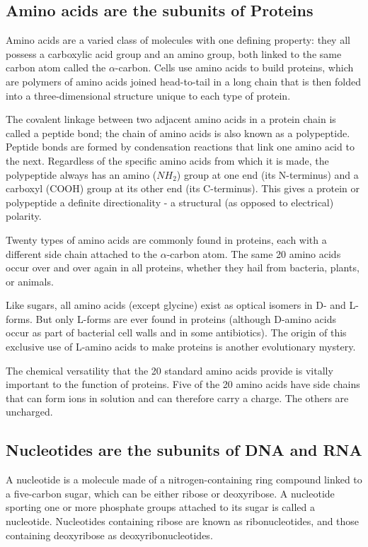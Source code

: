 \subsection{Amino acids are the subunits of Proteins}

Amino acids are a varied class of molecules with one defining property:
they all possess a carboxylic acid group and an amino group, both
linked to the same carbon atom called the $\alpha$-carbon.
Cells use amino acids to build proteins, which are polymers of
amino acids joined head-to-tail in a long chain that is then folded into a
three-dimensional structure unique to each type of protein.

The covalent linkage between two adjacent amino acids in a protein
chain is called a peptide bond; the chain of amino acids is also known as
a polypeptide. Peptide bonds are formed by condensation
reactions that link one amino acid to the next. Regardless of the specific
amino acids from which it is made, the polypeptide always has an amino
($NH_{2}$) group at one end (its N-terminus) and a carboxyl (COOH) group at
its other end (its C-terminus). This gives a protein or polypeptide a definite
directionality - a structural (as opposed to electrical) polarity.

Twenty types of amino acids are commonly found in proteins, each with a
different side chain attached to the $\alpha$-carbon atom.
The same 20 amino acids occur over and over again in all proteins,
whether they hail from bacteria, plants, or animals.

Like sugars, all amino acids (except glycine) exist as optical isomers in D-
and L-forms. But only L-forms are ever found in proteins
(although D-amino acids occur as part of bacterial cell walls and in some
antibiotics). The origin of this exclusive use of L-amino acids to make
proteins is another evolutionary mystery.

The chemical versatility that the 20 standard amino acids provide is
vitally important to the function of proteins. Five of the 20 amino acids
have side chains that can form ions in solution and can therefore carry
a charge. The others are uncharged.

\subsection{Nucleotides are the subunits of DNA and RNA}

A nucleotide is a molecule made of a nitrogen-containing ring compound
linked to a five-carbon sugar, which can be either ribose or deoxyribose.
A nucleotide sporting one or more phosphate
groups attached to its sugar is called a nucleotide. Nucleotides containing
ribose are known as ribonucleotides, and those containing deoxyribose as
deoxyribonucleotides.

